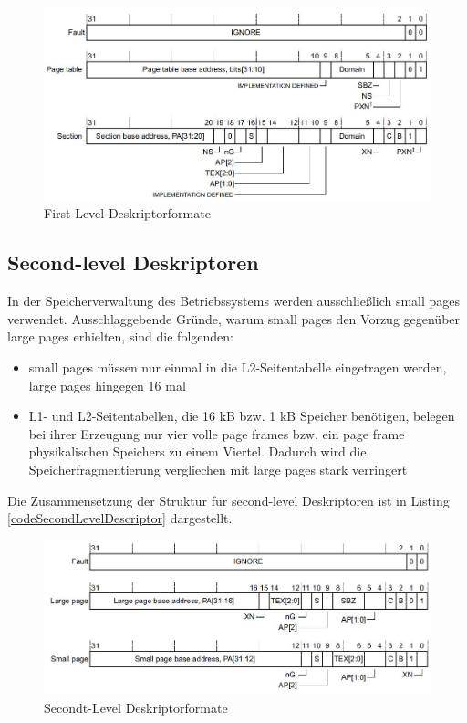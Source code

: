 \begin{figure}[H]
	\includegraphics[scale=0.7]{figures/firstLevelDescriptor}
	\caption{First-Level Deskriptorformate \cite[S. B3-1326]{ARM:ARM}}
	\label{fig:firstLevelDescriptor}
\end{figure}




\subsection*{Second-level Deskriptoren}

In der Speicherverwaltung des Betriebssystems werden ausschließlich small pages verwendet. Ausschlaggebende Gründe, warum small pages den Vorzug gegenüber large pages erhielten, sind die folgenden:

\begin{itemize}
	\item small pages müssen nur einmal in die L2-Seitentabelle eingetragen werden, large pages hingegen 16 mal
	\item L1- und L2-Seitentabellen, die 16 kB bzw. 1 kB Speicher benötigen, belegen bei ihrer Erzeugung nur vier volle page frames bzw. ein page frame physikalischen Speichers zu einem Viertel. Dadurch wird die Speicherfragmentierung vergliechen mit large pages stark verringert
\end{itemize}

Die Zusammensetzung der Struktur für second-level Deskriptoren ist in Listing \ref{codeSecondLevelDescriptor} dargestellt.\\

\begin{figure}[H]
	\includegraphics[scale=0.7]{figures/secondLevelDescriptor}
	\caption{Secondt-Level Deskriptorformate \cite[S. B3-1327]{ARM:ARM}}
	\label{fig:secondLevelDescriptor}
\end{figure}


